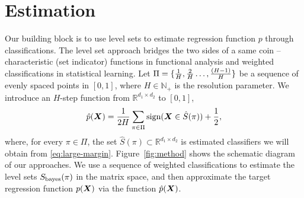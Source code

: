 \documentclass[11pt]{article}
\theoremstyle{definition}
\def\sign{\textup{sign}}
\def\bayesS{S_{\textup{bayes}}}
\begin{document}
\section{Estimation}\label{sec:idea}
\vspace{-.3cm}%
Our building block is to use level sets to estimate regression function $p$ through classifications. The level set approach bridges the two sides of a same coin -- characteristic (set indicator) functions in functional analysis and weighted classifications in statistical learning.  Let $\Pi=\{{1\over H},{2\over H} \ldots, {(H-1)\over H} \}$ be a sequence of evenly spaced points in $[0,1]$, where $H\in\mathbb{N}_{+}$ is the resolution parameter. We introduce an $H$-step function from $\mathbb{R}^{d_1\times d_2}$ to $[0,1]$,
\begin{equation}\label{eq:stepfunction}
\hat p(\mX)= {1\over 2H}  \sum_{\pi \in \Pi} \sign (\mX\in \hat S(\pi))+{1\over 2},
\end{equation}
where, for every $\pi\in\Pi$, the set $\hat S(\pi)\subset \mathbb{R}^{d_1\times d_2}$ is estimated classifiers we will obtain from \eqref{eq:large-margin}.
Figure~\ref{fig:method} shows the schematic diagram of our approaches. We use a sequence of weighted classifications to estimate the level sets $\bayesS(\pi)$ in the matrix space, and then approximate the target regression function $p(\bm X)$ via the function $\hat p(\bm X)$. 
\end{document}
